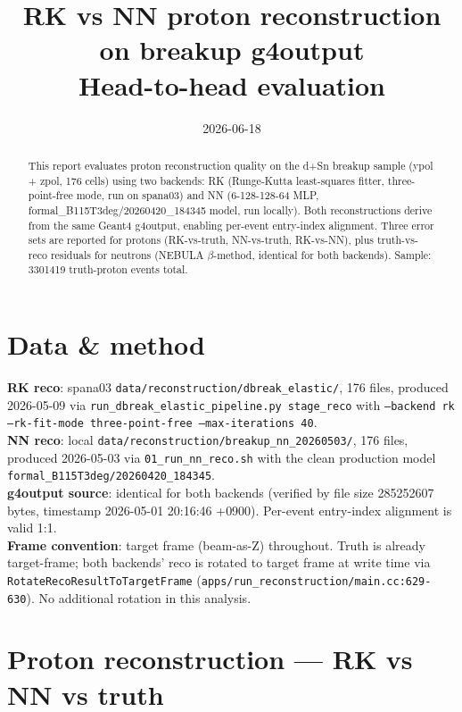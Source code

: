 \documentclass[11pt]{article}
\title{RK vs NN proton reconstruction on breakup g4output \\ \large Head-to-head evaluation}
\date{2026-06-18}
\begin{document}
\maketitle

\begin{abstract}
This report evaluates proton reconstruction quality on the d+Sn breakup sample (ypol + zpol, 176 cells) using two backends: RK (Runge-Kutta least-squares fitter, three-point-free mode, run on spana03) and NN (6-128-128-64 MLP, formal\_B115T3deg/20260420\_184345 model, run locally). Both reconstructions derive from the same Geant4 g4output, enabling per-event entry-index alignment. Three error sets are reported for protons (RK-vs-truth, NN-vs-truth, RK-vs-NN), plus truth-vs-reco residuals for neutrons (NEBULA $\beta$-method, identical for both backends). Sample: 3301419 truth-proton events total.
\end{abstract}

\section{Data \& method}
\textbf{RK reco}: spana03 \texttt{data/reconstruction/dbreak\_elastic/}, 176 files, produced 2026-05-09 via \texttt{run\_dbreak\_elastic\_pipeline.py stage\_reco} with \texttt{--backend rk --rk-fit-mode three-point-free --max-iterations 40}. \\
\textbf{NN reco}: local \texttt{data/reconstruction/breakup\_nn\_20260503/}, 176 files, produced 2026-05-03 via \texttt{01\_run\_nn\_reco.sh} with the clean production model \texttt{formal\_B115T3deg/20260420\_184345}. \\
\textbf{g4output source}: identical for both backends (verified by file size 285252607 bytes, timestamp 2026-05-01 20:16:46 +0900). Per-event entry-index alignment is valid 1:1. \\
\textbf{Frame convention}: target frame (beam-as-Z) throughout. Truth is already target-frame; both backends' reco is rotated to target frame at write time via \texttt{RotateRecoResultToTargetFrame} (\texttt{apps/run\_reconstruction/main.cc:629-630}). No additional rotation in this analysis. \\

\section{Proton reconstruction --- RK vs NN vs truth}
\end{document}

